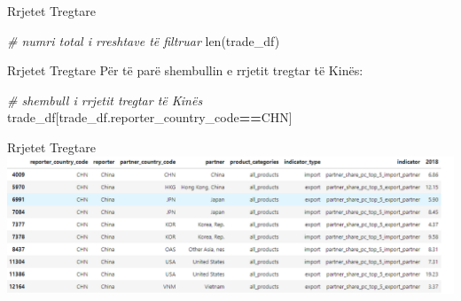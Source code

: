 \documentclass[
  ignorenonframetext,
]{beamer}
\newenvironment{Shaded}{\begin{snugshade}}{\end{snugshade}}
\newcommand{\BuiltInTok}[1]{#1}
\newcommand{\CommentTok}[1]{\textcolor[rgb]{0.56,0.35,0.01}{\textit{#1}}}
\newcommand{\NormalTok}[1]{#1}
\newcommand{\OperatorTok}[1]{\textcolor[rgb]{0.81,0.36,0.00}{\textbf{#1}}}
\newcommand{\StringTok}[1]{\textcolor[rgb]{0.31,0.60,0.02}{#1}}
\begin{document}
\begin{frame}[fragile]{Rrjetet Tregtare}
\protect\hypertarget{rrjetet-tregtare-5}{}

\begin{Shaded}
\begin{Highlighting}[]
\CommentTok{\# numri total i rreshtave të filtruar}
\BuiltInTok{len}\NormalTok{(trade\_df)}
\end{Highlighting}
\end{Shaded}
\end{frame}

\begin{frame}[fragile]{Rrjetet Tregtare}
\protect\hypertarget{rrjetet-tregtare-6}{}
Për të parë shembullin e rrjetit tregtar të Kinës:


\begin{Shaded}
\begin{Highlighting}[]
\CommentTok{\# shembull i rrjetit tregtar të Kinës}
\NormalTok{trade\_df[trade\_df.reporter\_country\_code}\OperatorTok{==}\StringTok{\textquotesingle{}CHN\textquotesingle{}}\NormalTok{]}
\end{Highlighting}
\end{Shaded}
\end{frame}

\begin{frame}{Rrjetet Tregtare}
\protect\hypertarget{rrjetet-tregtare-7}{}
\includegraphics{./Figs/trade2.png}
\end{frame}
\end{document}
